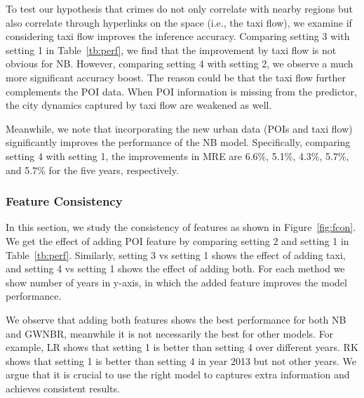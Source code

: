 To test our hypothesis that crimes do not only correlate with nearby regions but also correlate through hyperlinks on the space (i.e., the taxi flow), we examine if considering taxi flow improves the inference accuracy. Comparing setting 3 with setting 1 in Table~\ref{tb:perf}, we find that the improvement by taxi flow is not obvious for NB. However, comparing setting 4 with setting 2, we observe a much more significant accuracy boost. The reason could be that the taxi flow further complements the POI data. When POI information is missing from the predictor, the city dynamics captured by taxi flow are weakened as well.

Meanwhile, we note that incorporating the new urban data (POIs and taxi flow) significantly improves the performance of the NB model. Specifically, comparing  setting 4 with setting 1, the improvements in MRE are 6.6\%, 5.1\%, 4.3\%, 5.7\%, and 5.7\% for the five years, respectively.


\subsubsection{Feature Consistency}

In this section, we study the consistency of features as shown in Figure~\ref{fig:fcon}. We get the effect of adding POI feature by comparing setting 2 and setting 1 in Table~\ref{tb:perf}. Similarly, setting 3 vs setting 1 shows the effect of adding taxi, and setting 4 vs setting 1 shows the effect of adding both. For each method we show number of years in y-axis, in which the added feature improves the model performance.

We observe that adding both features shows the best performance for both NB and GWNBR, meanwhile it is not necessarily the best for other models. For example, LR shows that setting 1 is better than setting 4 over different years. RK shows that setting 1 is better than setting 4 in year 2013 but not other years. We argue that it is crucial to use the right model to captures extra information and achieves consistent results.

